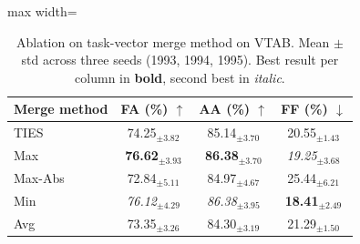 \begin{table}[!t]
\centering
\caption{Ablation on task-vector merge method on VTAB. Mean $\pm$ std across three seeds (1993, 1994, 1995). Best result per column in \textbf{bold}, second best in \textit{italic}.}
\label{tab:ablation-merge-method}
\renewcommand{\arraystretch}{0.95}
\begin{adjustbox}{max width=\textwidth}
\footnotesize
\begin{tabular}{l c c c}
\toprule
Merge method & \textbf{FA (\%)} $\uparrow$ & \textbf{AA (\%)} $\uparrow$ & \textbf{FF (\%)} $\downarrow$ \\
\midrule
TIES & 74.25$_{\pm 3.82}$ & 85.14$_{\pm 3.70}$ & 20.55$_{\pm 1.43}$ \\
Max & \textbf{76.62}$_{\pm 3.93}$ & \textbf{86.38}$_{\pm 3.70}$ & \textit{19.25}$_{\pm 3.68}$ \\
Max-Abs & 72.84$_{\pm 5.11}$ & 84.97$_{\pm 4.67}$ & 25.44$_{\pm 6.21}$ \\
Min & \textit{76.12}$_{\pm 4.29}$ & \textit{86.38}$_{\pm 3.95}$ & \textbf{18.41}$_{\pm 2.49}$ \\
Avg & 73.35$_{\pm 3.26}$ & 84.30$_{\pm 3.19}$ & 21.29$_{\pm 1.50}$ \\
\bottomrule
\end{tabular}
\end{adjustbox}
\end{table}